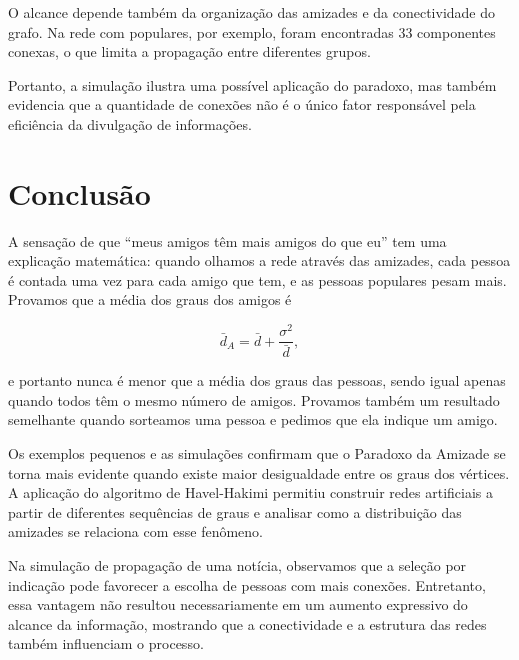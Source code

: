 \documentclass[12pt,a4paper]{article}
\theoremstyle{plain}
\theoremstyle{definition}
\theoremstyle{remark}
\newcommand{\dm}{\bar d}          %
\newcommand{\dA}{\bar d_{A}}      %
\begin{document}
O alcance depende também da organização das amizades
e da conectividade do grafo. Na rede com populares,
por exemplo, foram encontradas 33 componentes conexas,
o que limita a propagação entre diferentes grupos.

Portanto, a simulação ilustra uma possível aplicação
do paradoxo, mas também evidencia que a quantidade
de conexões não é o único fator responsável pela
eficiência da divulgação de informações.

\section{Conclusão}

A sensação de que ``meus amigos têm mais amigos do que eu''
tem uma explicação matemática: quando olhamos a rede
através das amizades, cada pessoa é contada uma vez
para cada amigo que tem, e as pessoas populares
pesam mais. Provamos que a média dos graus dos amigos é

\[
\dA = \dm + \frac{\sigma^2}{\dm},
\]

e portanto nunca é menor que a média dos graus das
pessoas, sendo igual apenas quando todos têm o mesmo
número de amigos. Provamos também um resultado semelhante
quando sorteamos uma pessoa e pedimos que ela indique
um amigo.

Os exemplos pequenos e as simulações confirmam que
o Paradoxo da Amizade se torna mais evidente quando
existe maior desigualdade entre os graus dos vértices.
A aplicação do algoritmo de Havel-Hakimi permitiu
construir redes artificiais a partir de diferentes
sequências de graus e analisar como a distribuição
das amizades se relaciona com esse fenômeno.

Na simulação de propagação de uma notícia, observamos
que a seleção por indicação pode favorecer a escolha
de pessoas com mais conexões. Entretanto, essa vantagem
não resultou necessariamente em um aumento expressivo
do alcance da informação, mostrando que a conectividade
e a estrutura das redes também influenciam o processo.
\end{document}
